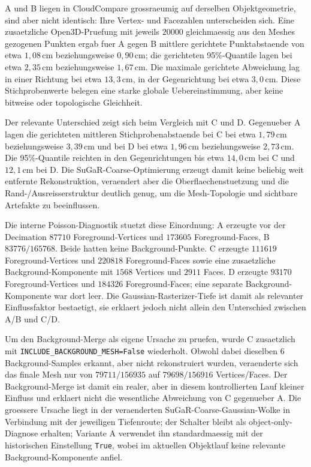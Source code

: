\documentclass[12pt,a4paper]{article}
\begin{document}
A und B liegen in CloudCompare grossraeumig auf derselben Objektgeometrie,
sind aber nicht identisch: Ihre Vertex- und Facezahlen unterscheiden sich.
Eine zusaetzliche Open3D-Pruefung mit jeweils $20000$ gleichmaessig aus den
Meshes gezogenen Punkten ergab fuer A gegen B mittlere gerichtete
Punktabstaende von etwa $1{,}08\,\mathrm{cm}$ beziehungsweise
$0{,}90\,\mathrm{cm}$; die gerichteten 95\%-Quantile lagen bei etwa
$2{,}35\,\mathrm{cm}$ beziehungsweise $1{,}67\,\mathrm{cm}$. Die maximale
gerichtete Abweichung lag in einer Richtung bei etwa $13{,}3\,\mathrm{cm}$,
in der Gegenrichtung bei etwa $3{,}0\,\mathrm{cm}$. Diese Stichprobenwerte
belegen eine starke globale Uebereinstimmung, aber keine bitweise oder
topologische Gleichheit.

Der relevante Unterschied zeigt sich beim Vergleich mit C und D. Gegenueber A
lagen die gerichteten mittleren Stichprobenabstaende bei C bei etwa
$1{,}79\,\mathrm{cm}$ beziehungsweise $3{,}39\,\mathrm{cm}$ und bei D bei etwa
$1{,}96\,\mathrm{cm}$ beziehungsweise $2{,}73\,\mathrm{cm}$. Die 95\%-Quantile
reichten in den Gegenrichtungen bis etwa $14{,}0\,\mathrm{cm}$ bei C und
$12{,}1\,\mathrm{cm}$ bei D. Die SuGaR-Coarse-Optimierung erzeugt damit
keine beliebig weit entfernte Rekonstruktion, veraendert aber die
Oberflaechenstuetzung und die Rand-/Ausreisserstruktur deutlich genug, um die
Mesh-Topologie und sichtbare Artefakte zu beeinflussen.

Die interne Poisson-Diagnostik stuetzt diese Einordnung: A erzeugte vor der
Decimation $87710$ Foreground-Vertices und $173605$ Foreground-Faces, B
$83776/165768$. Beide hatten keine Background-Punkte. C erzeugte
$111619$ Foreground-Vertices und $220818$ Foreground-Faces sowie eine
zusaetzliche Background-Komponente mit $1568$ Vertices und $2911$ Faces. D
erzeugte $93170$ Foreground-Vertices und $184326$ Foreground-Faces; eine
separate Background-Komponente war dort leer. Die Gaussian-Rasterizer-Tiefe
ist damit als relevanter Einflussfaktor bestaetigt, sie erklaert jedoch nicht
allein den Unterschied zwischen A/B und C/D.

Um den Background-Merge als eigene Ursache zu pruefen, wurde C zusaetzlich
mit \texttt{INCLUDE\_BACKGROUND\_MESH=False} wiederholt. Obwohl dabei dieselben
$6$ Background-Samples erkannt, aber nicht rekonstruiert wurden, veraenderte
sich das finale Mesh nur von $79711/156935$ auf $79698/156916$
Vertices/Faces. Der Background-Merge ist damit ein realer, aber in diesem
kontrollierten Lauf kleiner Einfluss und erklaert nicht die wesentliche
Abweichung von C gegenueber A. Die groessere Ursache liegt in der veraenderten
SuGaR-Coarse-Gaussian-Wolke in Verbindung mit der jeweiligen Tiefenroute;
der Schalter bleibt als object-only-Diagnose erhalten; Variante A verwendet
ihn standardmaessig mit der historischen Einstellung \texttt{True}, wobei im
aktuellen Objektlauf keine relevante Background-Komponente anfiel.
\end{document}
